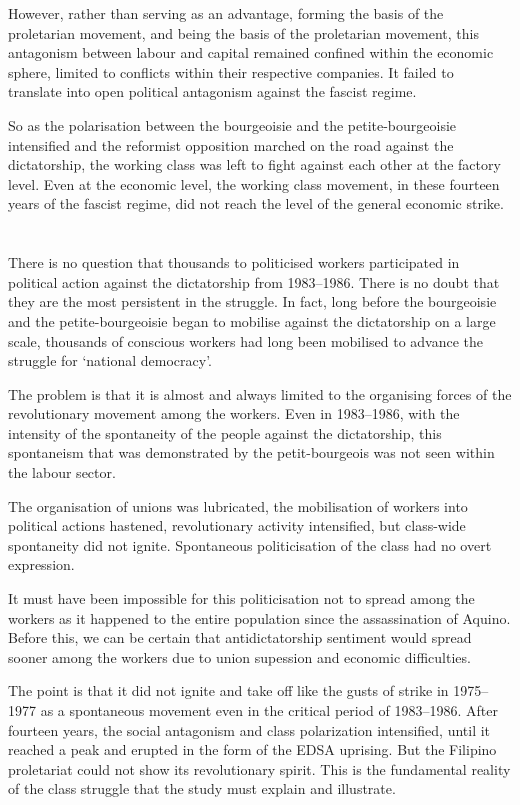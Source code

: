 However, rather than serving as an advantage,
forming the basis of the proletarian movement, 
and being the basis of the proletarian movement, 
this antagonism between labour and capital 
remained confined within the economic sphere,
limited to conflicts within their respective companies.
It failed to translate into open political antagonism against the fascist regime.

So as the polarisation between the bourgeoisie 
and the petite-bourgeoisie intensified 
and the reformist opposition marched on the road against the dictatorship, 
the working class was left to fight against each other at the factory level. 
Even at the economic level, 
the working class movement, 
in these fourteen years of the fascist regime, 
did not reach the level of the general economic strike.


\section{}
There is no question 
that thousands to politicised workers 
participated in political action 
against the dictatorship from 1983--1986.
There is no doubt
that they are the most persistent in the struggle.
In fact, 
long before the bourgeoisie and the petite-bourgeoisie 
began to mobilise against the dictatorship on a large scale,
thousands of conscious workers had long been mobilised
to advance the struggle for `national democracy'.

The problem is that 
it is almost and always limited 
to the organising forces of the revolutionary movement among the workers.
Even in 1983--1986, 
with the intensity of the spontaneity of the people against the dictatorship,
this spontaneism that was demonstrated by the petit-bourgeois
was not seen within the labour sector.

The organisation of unions was lubricated,
the mobilisation of workers
into political actions hastened,
revolutionary activity intensified,
but class-wide spontaneity did not ignite. 
Spontaneous politicisation of the class 
had no overt expression.

It must have been impossible for this politicisation 
not to spread among the workers
as it happened to the entire population 
since the assassination of Aquino. 
Before this, we can be certain
that antidictatorship sentiment 
would spread sooner 
among the workers
due to union supession and economic difficulties.

The point is that it did not ignite and take off 
like the gusts of strike in 1975--1977 
as a spontaneous movement even in the critical period of 1983--1986. 
After fourteen years, 
the social antagonism and class polarization intensified,
until it reached a peak and erupted 
in the form of the EDSA uprising. 
But the Filipino proletariat could not show its revolutionary spirit. 
This is the fundamental reality of the class struggle 
that the study must explain and illustrate.


